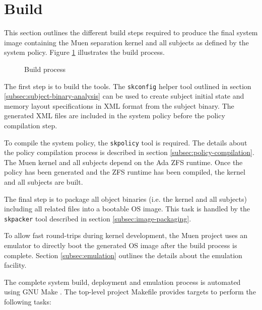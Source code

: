 \section{Build}
This section outlines the different build steps required to produce the final
system image containing the Muen separation kernel and all subjects as defined
by the system policy. Figure \ref{fig:build-process} illustrates the build
process.

\begin{figure}[h]
	\centering
	
	\caption{Build process}
	\label{fig:build-process}
\end{figure}

The first step is to build the tools. The \texttt{skconfig} helper tool
outlined in section \ref{subsec:subject-binary-analysis} can be used to create
subject initial state and memory layout specifications in XML format from the
subject binary. The generated XML files are included in the system policy
before the policy compilation step.

To compile the system policy, the \texttt{skpolicy} tool is required. The
details about the policy compilation process is described in section
\ref{subsec:policy-compilation}. The Muen kernel and all subjects depend on the
Ada ZFS runtime. Once the policy has been generated and the ZFS runtime has
been compiled, the kernel and all subjects are built.

The final step is to package all object binaries (i.e. the kernel and all
subjects) including all related files into a bootable OS image. This task is
handled by the \texttt{skpacker} tool described in section
\ref{subsec:image-packaging}.

To allow fast round-trips during kernel development, the Muen project uses
an emulator to directly boot the generated OS image after the build process is
complete. Section \ref{subsec:emulation} outlines the details about the
emulation facility.

The complete system build, deployment and emulation process is automated using
GNU Make \cite{make}. The top-level project Makefile provides targets to
perform the following tasks:

